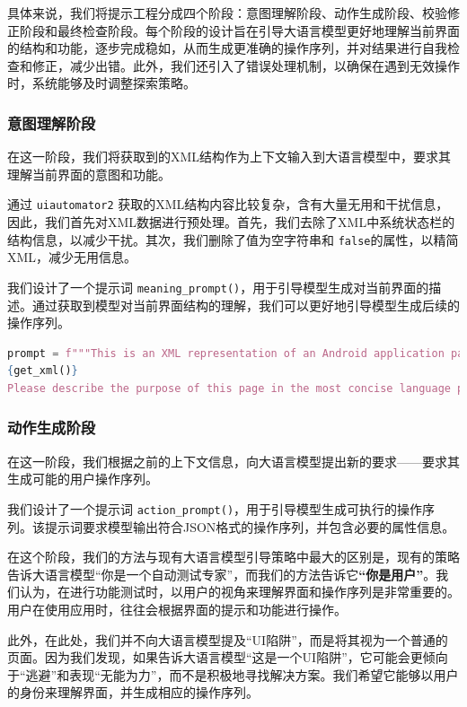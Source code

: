 \documentclass{article}
\begin{document}
具体来说，我们将提示工程分成四个阶段：意图理解阶段、动作生成阶段、校验修正阶段和最终检查阶段。每个阶段的设计旨在引导大语言模型更好地理解当前界面的结构和功能，逐步完成稳如，从而生成更准确的操作序列，并对结果进行自我检查和修正，减少出错。此外，我们还引入了错误处理机制，以确保在遇到无效操作时，系统能够及时调整探索策略。


\subsubsection{意图理解阶段} 

在这一阶段，我们将获取到的XML结构作为上下文输入到大语言模型中，要求其理解当前界面的意图和功能。

通过 \texttt{uiautomator2} 获取的XML结构内容比较复杂，含有大量无用和干扰信息，因此，我们首先对XML数据进行预处理。首先，我们去除了XML中系统状态栏的结构信息，以减少干扰。其次，我们删除了值为空字符串和 \texttt{false}的属性，以精简XML，减少无用信息。

我们设计了一个提示词 \texttt{meaning\_prompt()}，用于引导模型生成对当前界面的描述。通过获取到模型对当前界面结构的理解，我们可以更好地引导模型生成后续的操作序列。
\begin{lstlisting}[language=Python]
prompt = f"""This is an XML representation of an Android application page:
{get_xml()}
Please describe the purpose of this page in the most concise language possible."""
\end{lstlisting}

\subsubsection{动作生成阶段} 

在这一阶段，我们根据之前的上下文信息，向大语言模型提出新的要求——要求其生成可能的用户操作序列。

我们设计了一个提示词 \texttt{action\_prompt()}，用于引导模型生成可执行的操作序列。该提示词要求模型输出符合JSON格式的操作序列，并包含必要的属性信息。

在这个阶段，我们的方法与现有大语言模型引导策略中最大的区别是，现有的策略告诉大语言模型``你是一个自动测试专家''，而我们的方法告诉它\textbf{``你是用户''}。我们认为，在进行功能测试时，以用户的视角来理解界面和操作序列是非常重要的。用户在使用应用时，往往会根据界面的提示和功能进行操作。

此外，在此处，我们并不向大语言模型提及``UI陷阱''，而是将其视为一个普通的页面。因为我们发现，如果告诉大语言模型``这是一个UI陷阱''，它可能会更倾向于``逃避''和表现``无能为力''，而不是积极地寻找解决方案。我们希望它能够以用户的身份来理解界面，并生成相应的操作序列。
\end{document}
